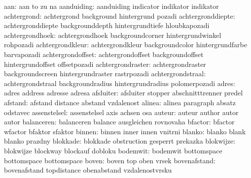                  aan:  aan                  to                   zu
                       na
          aanduiding:  aanduiding           indicator            indikator
                       indikator
         achtergrond:  achtergrond          background           hintergrund
                       pozadi
   achtergronddiepte:  achtergronddiepte    backgrounddepth      hintergrundtiefe
                       hloubkapozadi
     achtergrondhoek:  achtergrondhoek      backgroundcorner     hintergrundwinkel
                       rohpozadi
    achtergrondkleur:  achtergrondkleur     backgroundcolor      hintergrundfarbe
                       barvapozadi
   achtergrondoffset:  achtergrondoffset    backgroundoffset     hintergrundoffset
                       offsetpozadi
   achtergrondraster:  achtergrondraster    backgroundscreen     hintergrundraster
                       rastrpozadi
   achtergrondstraal:  achtergrondstraal    backgroundradius     hintergrundradius
                       polomerpozadi
               adres:  adres                address              adresse
                       adresa
           afsluiter:  afsluiter            stopper              abschnitttrenner
                       predel
             afstand:  afstand              distance             abstand
                       vzdalenost
              alinea:  alinea               paragraph            absatz
                       odstavec 
        assenstelsel:  assenstelsel         axis                 achsen
                       osa
              auteur:  auteur               author               autor
                       autor
          balanceren:  balanceren           balance              ausgleichen
                       rovnovaha
             bfactor:  bfactor              wfactor              bfaktor
                       sfaktor
              binnen:  binnen               inner                innen
                       vnitrni
              blanko:  blanko               blank                blanko
                       prazdny
            blokkade:  blokkade             obstruction          gesperrt
                       prekazka
           blokwijze:  blokwijze            blockway             blockauf
                       dobloku
            bodemwit:  bodemwit             bottomspace          bottomspace 
                       bottomspace 
               boven:  boven                top                  oben
                       vrsek
        bovenafstand:  bovenafstand         topdistance          obenabstand
                       vzdalenostvrsku
